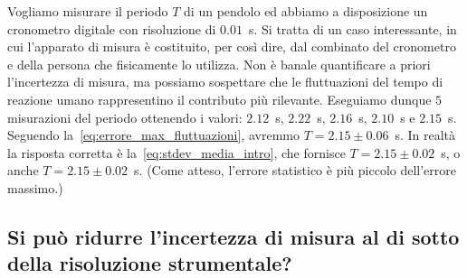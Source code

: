 \begin{examplebox}
  \begin{example}\label{exp:pendolo_errore}
    Vogliamo misurare il periodo $T$ di un pendolo ed abbiamo a disposizione
    un cronometro digitale con risoluzione di $0.01$~s. Si tratta di un caso
    interessante, in cui l'apparato di misura è costituito, per così dire,
    dal combinato del cronometro e della persona che fisicamente lo utilizza.
    Non è banale quantificare a priori l'incertezza di misura, ma possiamo
    sospettare che le fluttuazioni del tempo di reazione umano rappresentino il
    contributo più rilevante.
    Eseguiamo dunque $5$ misurazioni del periodo ottenendo i valori:
    $2.12$~s, $2.22$~s, $2.16$~s, $2.10$~s e $2.15$~s. Seguendo
    la~\eqref{eq:errore_max_fluttuazioni}, avremmo $T = 2.15 \pm 0.06$~s.
    In realtà la risposta corretta è la~\eqref{eq:stdev_media_intro}, che
    fornisce $T = 2.15 \pm 0.02$~s, o anche $T = 2.15 \pm 0.02$~s.
    (Come atteso, l'errore statistico è più piccolo dell'errore massimo.)
  \end{example}
\end{examplebox}

\begin{snippet}[htb!]
  \bigskip %
\end{snippet}


\subsection{Si può ridurre l'incertezza di misura al di sotto della
  risoluzione strumentale?}
\label{sec:misure_sotto_risoluzione}

